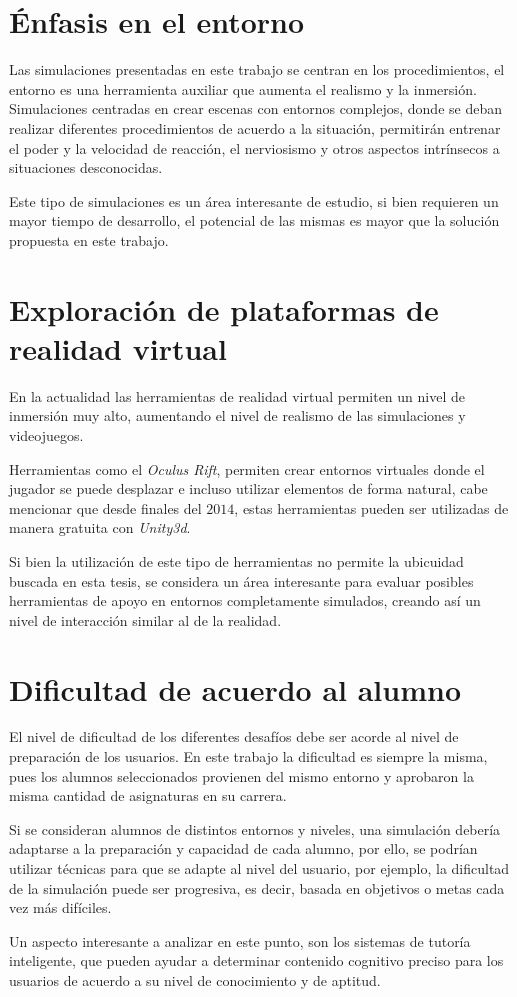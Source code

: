 \section{Énfasis en el entorno}

Las simulaciones presentadas en este trabajo se centran en los procedimientos,
el entorno es una herramienta auxiliar que aumenta el realismo y la inmersión.
Simulaciones centradas en crear escenas con entornos complejos, donde se deban
realizar diferentes procedimientos de acuerdo a la situación, permitirán
entrenar el poder y la velocidad de reacción, el nerviosismo y otros aspectos
intrínsecos a situaciones desconocidas. 

Este tipo de simulaciones es un área interesante de estudio, si bien requieren
un mayor tiempo de desarrollo, el potencial de las mismas es mayor que la
solución propuesta en este trabajo. 

\section{Exploración de plataformas de realidad virtual}

En la actualidad las herramientas de realidad virtual permiten un nivel de
inmersión muy alto, aumentando el nivel de realismo de las simulaciones y
videojuegos.     

Herramientas como el \emph{Oculus Rift}, permiten crear entornos virtuales donde
el jugador se puede desplazar e incluso utilizar elementos de forma
natural\cite{makerbot}, cabe mencionar que desde finales del $2014$, estas
herramientas pueden ser utilizadas de manera gratuita con
\emph{Unity3d}\cite{unity:vr}.

Si bien la utilización de este tipo de herramientas no permite la ubicuidad
buscada en esta tesis, se considera un área interesante para evaluar posibles
herramientas de apoyo en entornos completamente simulados, creando así un nivel
de interacción similar al de la realidad.


\section{Dificultad de acuerdo al alumno}

El nivel de dificultad de los diferentes desafíos debe ser acorde al nivel de
preparación de los usuarios. En este trabajo la dificultad es siempre la misma,
pues los alumnos seleccionados provienen del mismo entorno y aprobaron la misma
cantidad de asignaturas en su carrera.

Si se consideran alumnos de distintos entornos y niveles, una simulación debería adaptarse
a la preparación y capacidad de cada alumno, por ello, se podrían utilizar
técnicas para que se adapte al nivel del usuario, por ejemplo, la
dificultad de la simulación puede ser progresiva, es decir, basada en objetivos
o metas cada vez más difíciles.

Un aspecto interesante a analizar en este punto, son los sistemas de tutoría
inteligente, que pueden ayudar a determinar contenido cognitivo preciso para los
usuarios de acuerdo a su nivel de conocimiento y de aptitud.

